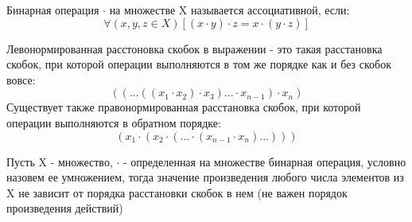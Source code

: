 \begin{Def}
	Бинарная операция $\cdot$ на множестве X называется ассоциативной, если: \[ \forall(x,y,z \in X) \left[ \left( x \cdot y \right) \cdot z =  x \cdot \left( y \cdot z \right) \right] \]
\end{Def}

\begin{Def}
	Левонормированная расстоновка скобок в выражении - это такая расстановка скобок, при которой операции выполняются в том же порядке как и без скобок вовсе:
	\[
		\left(\left( ... \left( \left( x_1 \cdot x_2 \right) \cdot x_3 \right) ... \cdot x_{n-1} \right) \cdot x_n \right)
	\]
	Существует также правонормированная расстановка скобок, при которой операции выполняются в обратном порядке:
	\[
		\left(x_1 \cdot \left( x_2 \cdot \left( ... \cdot \left( x_{n-1} \cdot x_n \right) ... \right) \right) \right)
	\]
\end{Def}

\begin{Th}
	Пусть X - множество, $\cdot$ - определенная на множестве бинарная операция, условно назовем ее умножением, тогда значение произведения любого числа элементов из X не зависит от порядка расстановки скобок в нем (не важен порядок произведения действий)
\end{Th}

